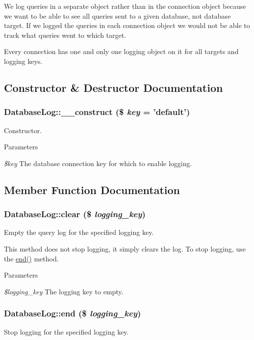 We log queries in a separate object rather than in the connection object because we want to be able to see all queries sent to a given database, not database target. If we logged the queries in each connection object we would not be able to track what queries went to which target.

Every connection has one and only one logging object on it for all targets and logging keys. 

\subsection{Constructor \& Destructor Documentation}
\hypertarget{classDatabaseLog_a4a73f612d4625189787c54ff361fd15e}{
\subsubsection[{\_\-\_\-construct}]{\setlength{\rightskip}{0pt plus 5cm}DatabaseLog::\_\-\_\-construct (\$ {\em key} = {\ttfamily 'default'})}}
\label{classDatabaseLog_a4a73f612d4625189787c54ff361fd15e}
Constructor.


\begin{DoxyParams}{Parameters}
\item[{\em \$key}]The database connection key for which to enable logging. \end{DoxyParams}


\subsection{Member Function Documentation}
\hypertarget{classDatabaseLog_a26e486bc63ee0dcfbfb82401815500f6}{
\subsubsection[{clear}]{\setlength{\rightskip}{0pt plus 5cm}DatabaseLog::clear (\$ {\em logging\_\-key})}}
\label{classDatabaseLog_a26e486bc63ee0dcfbfb82401815500f6}
Empty the query log for the specified logging key.

This method does not stop logging, it simply clears the log. To stop logging, use the \hyperlink{classDatabaseLog_a921215904c818b7e31fa5e24102eb0a2}{end()} method.


\begin{DoxyParams}{Parameters}
\item[{\em \$logging\_\-key}]The logging key to empty. \end{DoxyParams}
\hypertarget{classDatabaseLog_a921215904c818b7e31fa5e24102eb0a2}{
\subsubsection[{end}]{\setlength{\rightskip}{0pt plus 5cm}DatabaseLog::end (\$ {\em logging\_\-key})}}
\label{classDatabaseLog_a921215904c818b7e31fa5e24102eb0a2}
Stop logging for the specified logging key.


